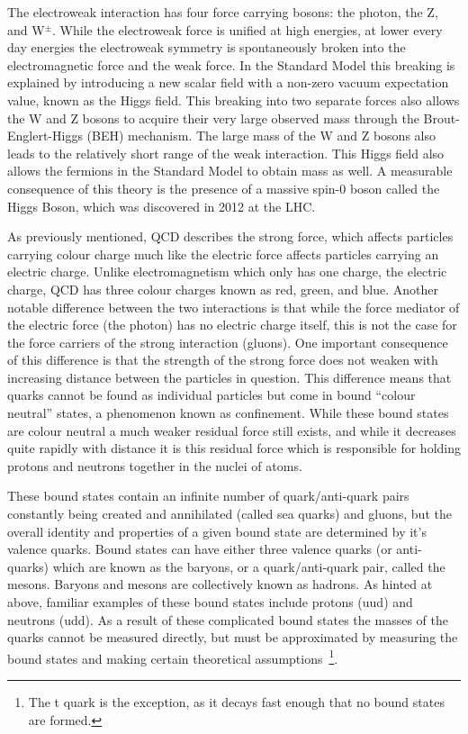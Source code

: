 The electroweak interaction has four force carrying bosons: the photon, the Z, and W$^{\pm}$.  
While the electroweak force is unified at high energies, at lower every day energies the electroweak symmetry is spontaneously broken into the electromagnetic force and the weak force.  
In the Standard Model this breaking is explained by introducing a new scalar field with a non-zero vacuum expectation value, known as the Higgs field.  
This breaking into two separate forces also allows the W and Z bosons to acquire their very large observed mass through the Brout-Englert-Higgs (BEH) mechanism.  
The large mass of the W and Z bosons also leads to the relatively short range of the weak interaction.  
This Higgs field also allows the fermions in the Standard Model to obtain mass as well.  
A measurable consequence of this theory is the presence of a massive spin-0 boson called the Higgs Boson, which was discovered in 2012 at the \gls{LHC}.  

As previously mentioned, \gls{QCD} describes the strong force, which affects particles carrying colour charge much like the electric force affects particles carrying an electric charge.  
Unlike electromagnetism which only has one charge, the electric charge, \gls{QCD} has three colour charges known as red, green, and blue.  
Another notable difference between the two interactions is that while the force mediator of the electric force (the photon) has no electric charge itself, this is not the case for the force carriers of the strong interaction (gluons).  
One important consequence of this difference is that the strength of the strong force does not weaken with increasing distance between the particles in question.  
This difference means that quarks cannot be found as individual particles but come in bound ``colour neutral'' states, a phenomenon known as confinement.  
While these bound states are colour neutral a much weaker residual force still exists, and while it decreases quite rapidly with distance it is this residual force which is responsible for holding protons and neutrons together in the nuclei of atoms.  

These bound states contain an infinite number of quark/anti-quark pairs constantly being created and annihilated (called sea quarks) and gluons, but the overall identity and properties of a given bound state are determined by it's valence quarks.  
Bound states can have either three valence quarks (or anti-quarks) which are known as the baryons, or a quark/anti-quark pair, called the mesons.  
Baryons and mesons are collectively known as hadrons.  
As hinted at above, familiar examples of these bound states include protons (uud) and neutrons (udd).  
As a result of these complicated bound states the masses of the quarks cannot be measured directly, but must be approximated by measuring the bound states and making certain theoretical assumptions~\footnote{The t quark is the exception, as it decays fast enough that no bound states are formed.}.
 

